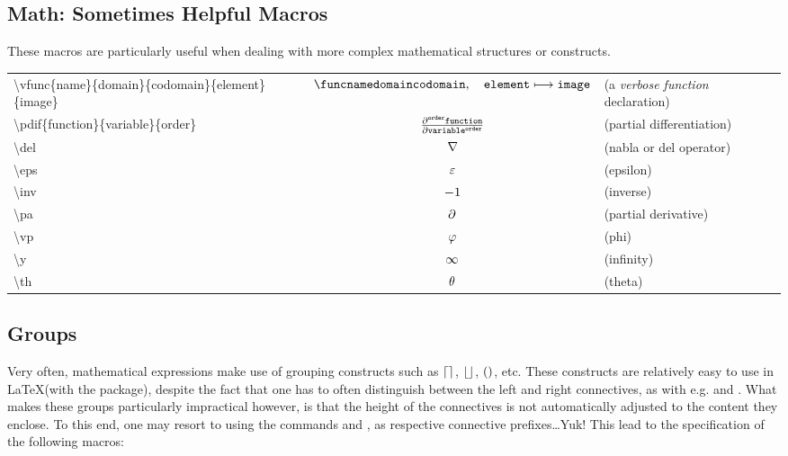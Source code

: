 \vspace{0.1in}

\subsection{Math: Sometimes Helpful Macros}

These macros are particularly useful when dealing with more complex mathematical structures or constructs.

\vspace{0.1in}

\noindent
\begin{tabular}{lcl}

\textbackslash vfunc\{name\}\{domain\}\{codomain\}\{element\}\{image\} & $\vfunc{\mathtt{name}}{\mathtt{domain}}{\mathtt{codomain}}{\mathtt{element}}{\mathtt{image}}$ & (a \emph{verbose function} declaration) \\
\textbackslash pdif\{function\}\{variable\}\{order\} & $\frac{\partial^{\mathtt{order}}\mathtt{function}}{\partial\mathtt{variable}^{\mathtt{order}}}$ & (partial differentiation) \\
\textbackslash del & $\nabla$ & (nabla or del operator) \\
\textbackslash eps & $\varepsilon$ & (epsilon) \\
\textbackslash inv & ${-1}$ & (inverse) \\
\textbackslash pa & $\partial$ & (partial derivative) \\
\textbackslash vp & $\varphi$ & (phi) \\
\textbackslash y & $\infty$ & (infinity) \\
\textbackslash th & $\theta$ & (theta) \\

\end{tabular}

\subsection{Groups}

Very often, mathematical expressions make use of grouping constructs such as
$\left\lceil{}\right\rceil$, $\left\lfloor{}\right\rfloor$, $\left({}\right)$, etc. These constructs are relatively easy to use
in \LaTeX (with the  package), despite the fact that one has to
often distinguish between the left and right connectives, as with e.g.
 and . What makes these groups particularly
impractical however, is that the height of the connectives is not automatically
adjusted to the content they enclose. To this end, one may resort to using the
commands  and , as respective connective
prefixes\dots Yuk!  This lead to the specification of the following macros:

